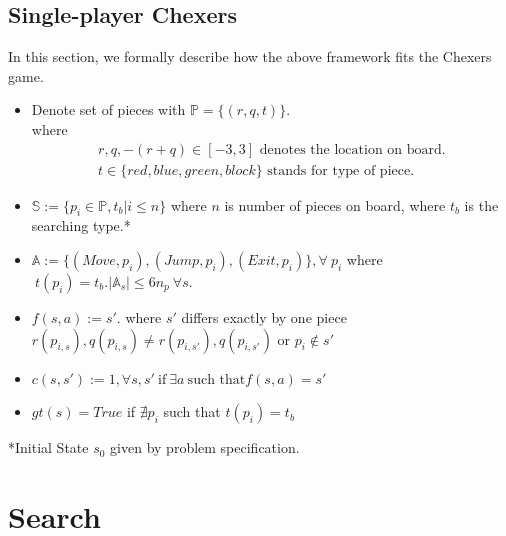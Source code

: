 \documentclass[10.5pt,a4paper]{article}
\begin{document}
    \subsection{Single-player Chexers}
    In this section, we formally describe how the above framework fits the Chexers game.
    \begin{itemize}
        \itemsep0em
        \item Denote set of pieces with $\mathbb{P}=\{(r, q, t)\}$. \\
        where
        \begin{align*}
            \text{$r, q, -(r+q)\in [-3, 3]$ denotes the location on board.}\\
            \text{$t\in \{red, blue, green, block\}$ stands for type of piece.}    
        \end{align*}
        
        \item $\mathbb{S} := \{p_i\in \mathbb{P}, t_b|i\le n\}$ where $n$ is number of pieces on board, where $t_b$ is the searching type.*
        \item $\mathbb{A} := \{(Move,p_i), (Jump, p_i), (Exit, p_i)\}, \forall\ p_i $ where$\ t(p_i)=t_b. | \mathbb{A}_s| \le 6n_p\ \forall s$.
        \item $f(s, a) := s'$. where $s'$ differs exactly by one piece $r(p_{i,s}), q(p_{i,s}) \ne r(p_{i,s'}), q(p_{i,s'})$ or $p_i\notin s'$
        \item $c(s, s') := 1, \forall s, s'\ \text{if}\ \exists a\ \text{such that} f(s, a) = s'$
        \item $gt(s) = True$ if $\nexists p_i$ such that $t(p_i) = t_b$
    \end{itemize}
    \vspace{-5pt}
    *Initial State $s_0$ given by problem specification.
    \vspace{-5pt}
    \section{Search}
\end{document}
